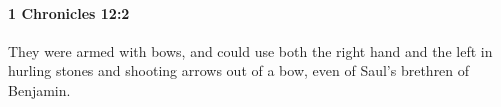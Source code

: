 
		\paragraph{1 Chronicles 12:2} %
			\label{1CHRONICLES-12-2}

			They were armed with bows, and could use both the right hand and the left in hurling stones and shooting arrows out of a bow, even of Saul’s brethren of Benjamin.


